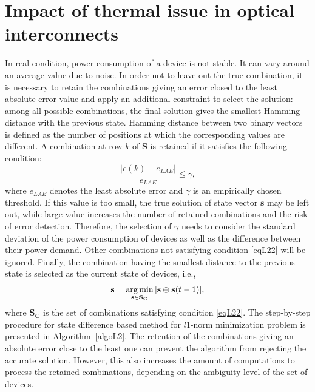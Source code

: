 \section{Impact of thermal issue in optical interconnects}\label{diff}
In real condition, power consumption of a device is not stable. It can vary around an average value due to noise. In order not to leave out the true combination, it is necessary to retain the combinations giving an error closed to the least absolute error value and apply an additional constraint to select the solution: among all possible combinations, the final solution gives the smallest Hamming distance with the previous state. Hamming distance between two binary vectors is defined as the number of positions at which the corresponding values are different. 
A combination at row $k$ of $\mathbf{S}$ is retained if it satisfies the following condition:
\begin{equation}\label{eqL22}
\frac{|e(k)-e_{LAE}|}{e_{LAE}}\leq \gamma,
\end{equation}
where $e_{LAE}$ denotes the least absolute error and $\gamma$ is an empirically chosen threshold.
If this value is too small, the true solution of state vector $\mathbf{s}$ may be left out, while large value increases the number of retained combinations and the risk of error detection. Therefore, the selection of $\gamma$ needs to consider the standard deviation of the power consumption of devices as well as the difference between their power demand. Other combinations not satisfying condition \eqref{eqL22} will be ignored.
Finally, the combination having the smallest distance to the previous state is selected as the current state of devices, i.e.,
\begin{equation}
\mathbf{s} = \operatorname*{arg\,min}_{\mathbf{s}\in \mathbf{S_C}}{|\mathbf{s}\oplus \mathbf{s}(t-1)|},
\end{equation}
where $\mathbf{S_C}$ is the set of combinations satisfying condition \eqref{eqL22}. The step-by-step procedure for state difference based method for $l1$-norm minimization problem is presented in Algorithm~\ref{algoL2}.
The retention of the combinations giving an absolute error close to the least one can prevent the algorithm from rejecting the accurate solution. However, this also increases the amount of computations to process the retained combinations, depending on the ambiguity level of the set of devices.

